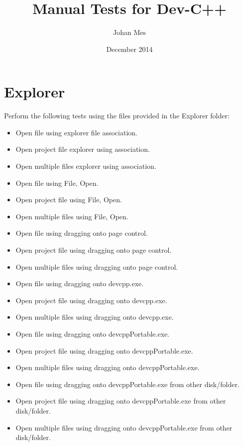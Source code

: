 \documentclass{article}
\title{Manual Tests for Dev-C++}
\author{Johan Mes}
\date{December 2014}
\begin{document}
\maketitle

\clearpage
\section{Explorer}
Perform the following tests using the files provided in the Explorer folder:
\begin{itemize}
    \item Open file using explorer file association.
    \item Open project file explorer using association.
    \item Open multiple files explorer using association.
    
    \item Open file using File, Open.
    \item Open project file using File, Open.
    \item Open multiple files using File, Open.
    
    \item Open file using dragging onto page control.
    \item Open project file using dragging onto page control.
    \item Open multiple files using dragging onto page control.
    
    \item Open file using dragging onto devcpp.exe.
    \item Open project file using dragging onto devcpp.exe.
    \item Open multiple files using dragging onto devcpp.exe.
    
    \item Open file using dragging onto devcppPortable.exe.
    \item Open project file using dragging onto devcppPortable.exe.
    \item Open multiple files using dragging onto devcppPortable.exe.
    
    \item Open file using dragging onto devcppPortable.exe from other disk/folder.
    \item Open project file using dragging onto devcppPortable.exe from other disk/folder.
    \item Open multiple files using dragging onto devcppPortable.exe from other disk/folder.
\end{itemize}
\end{document}
